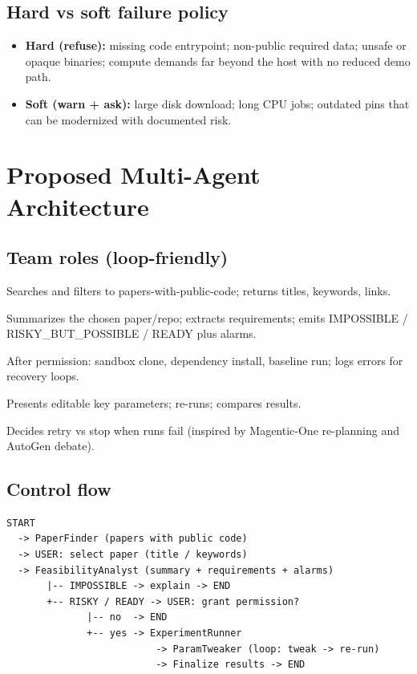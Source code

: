 \documentclass[11pt,a4paper]{article}
\begin{document}
\subsection{Hard vs soft failure policy}
\begin{itemize}[leftmargin=*]
  \item \textbf{Hard (refuse):} missing code entrypoint; non-public required
        data; unsafe or opaque binaries; compute demands far beyond the host
        with no reduced demo path.
  \item \textbf{Soft (warn + ask):} large disk download; long CPU jobs;
        outdated pins that can be modernized with documented risk.
\end{itemize}

\section{Proposed Multi-Agent Architecture}

\subsection{Team roles (loop-friendly)}
\begin{description}[style=nextline,leftmargin=1.2cm]
  \item[PaperFinder] Searches and filters to papers-with-public-code;
        returns titles, keywords, links.
  \item[FeasibilityAnalyst] Summarizes the chosen paper/repo; extracts
        requirements; emits IMPOSSIBLE / RISKY\_BUT\_POSSIBLE / READY plus
        alarms.
  \item[ExperimentRunner] After permission: sandbox clone, dependency
        install, baseline run; logs errors for recovery loops.
  \item[ParamTweaker] Presents editable key parameters; re-runs; compares
        results.
  \item[Critic / Orchestrator (optional)] Decides retry vs stop when runs
        fail (inspired by Magentic-One re-planning and AutoGen debate).
\end{description}

\subsection{Control flow}
\begin{verbatim}
START
  -> PaperFinder (papers with public code)
  -> USER: select paper (title / keywords)
  -> FeasibilityAnalyst (summary + requirements + alarms)
       |-- IMPOSSIBLE -> explain -> END
       +-- RISKY / READY -> USER: grant permission?
              |-- no  -> END
              +-- yes -> ExperimentRunner
                          -> ParamTweaker (loop: tweak -> re-run)
                          -> Finalize results -> END
\end{verbatim}
\end{document}
